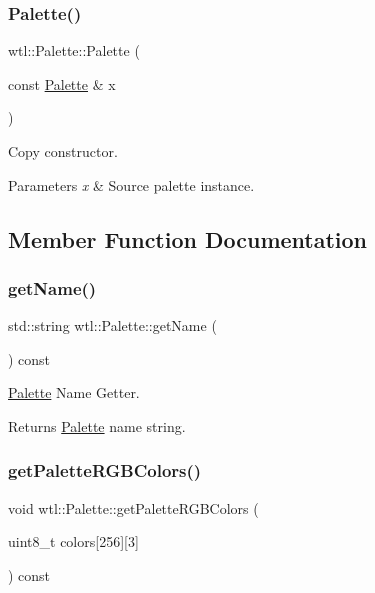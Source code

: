\subsubsection{\texorpdfstring{Palette()}{Palette()}\hspace{0.1cm}{\footnotesize\ttfamily [3/3]}}
{\footnotesize\ttfamily wtl\+::\+Palette\+::\+Palette (\begin{DoxyParamCaption}\item[{const \hyperlink{classwtl_1_1_palette}{Palette} \&}]{x }\end{DoxyParamCaption})}



Copy constructor. 


\begin{DoxyParams}{Parameters}
{\em x} & Source palette instance. \\
\hline
\end{DoxyParams}


\subsection{Member Function Documentation}
\mbox{\label{classwtl_1_1_palette_aba4a2d20fa181f012751e03d3270ee9d}} 
\subsubsection{\texorpdfstring{get\+Name()}{getName()}}
{\footnotesize\ttfamily std\+::string wtl\+::\+Palette\+::get\+Name (\begin{DoxyParamCaption}{ }\end{DoxyParamCaption}) const}



\hyperlink{classwtl_1_1_palette}{Palette} Name Getter. 

\begin{DoxyReturn}{Returns}
\hyperlink{classwtl_1_1_palette}{Palette} name string. 
\end{DoxyReturn}
\mbox{\label{classwtl_1_1_palette_af3031f114fdff5c9fa8b9f84152472e3}} 
\subsubsection{\texorpdfstring{get\+Palette\+R\+G\+B\+Colors()}{getPaletteRGBColors()}}
{\footnotesize\ttfamily void wtl\+::\+Palette\+::get\+Palette\+R\+G\+B\+Colors (\begin{DoxyParamCaption}\item[{uint8\+\_\+t}]{colors\mbox{[}256\mbox{]}\mbox{[}3\mbox{]} }\end{DoxyParamCaption}) const}



